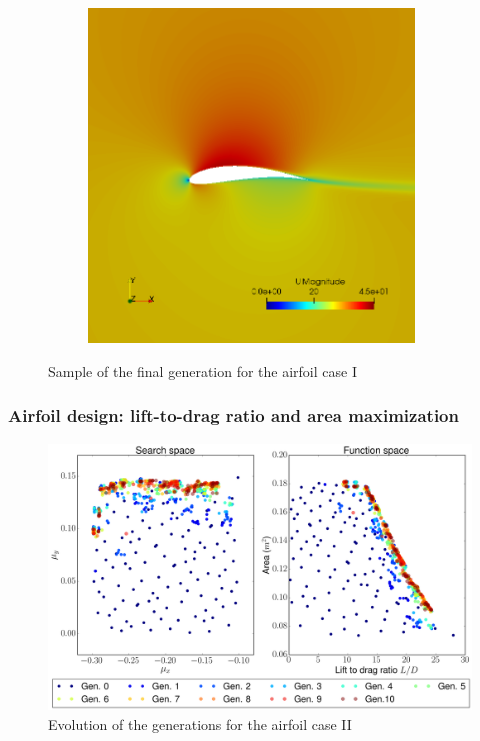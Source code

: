 \begin{figure}[h!]
\begin{subfigure}[t]{0.31\textwidth}
    \end{subfigure}
    \begin{subfigure}[t]{0.31\textwidth}
        \includegraphics[width=0.95\textwidth, height=0.17\textheight]{Figures/4/g10i55.png}
    \end{subfigure}
    \caption{Sample of the final generation for the airfoil case I}
    \label{fig:finalCLCD}
\end{figure}

    
\subsubsection*{Airfoil design: lift-to-drag ratio and area maximization}

     \begin{figure}[h!]
        \centering
        \small
        \includegraphics[width=\textwidth, height=0.35\textheight]{Figures/4/LDgen10.png}
        \caption{Evolution of the generations for the airfoil case II}
        \label{fig:genForLD}
    \end{figure}
    
